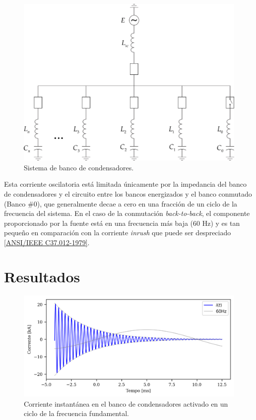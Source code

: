 \documentclass[a4paper]{article}
\begin{document}
	\begin{figure}[!hbp]
		\centering
		\includegraphics{Picture1.png}
		\caption{Sistema de banco de condensadores.}
		\label{fig:picture1}
	\end{figure}
	
	Esta corriente oscilatoria está limitada únicamente por la impedancia del banco de condensadores y el circuito entre los bancos energizados y el banco conmutado (Banco \#0), que generalmente decae a cero en una fracción de un ciclo de la frecuencia del sistema. En el caso de la conmutación \textit{back-to-back}, el componente proporcionado por la fuente está en una frecuencia más baja (60 Hz) y es tan pequeño en comparación con la corriente \textit{inrush} que puede ser despreciado \href{https://ieeexplore.ieee.org/document/7035261}{[ANSI/IEEE C37.012-1979]}.
	
	\section{Resultados}
	\begin{figure}[!hbp]
		\centering
		\includegraphics{Correntes.png}
		\caption{Corriente instantánea en el banco de condensadores activado en un ciclo de la frecuencia fundamental.}
		\label{fig:picture2}
	\end{figure}
	
\end{document}
